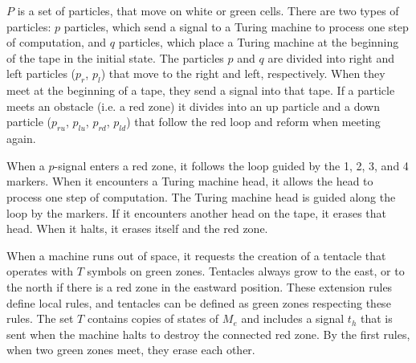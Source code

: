 \documentclass{llncs}
\begin{document}
    
 $P$ is a set of particles, that move on white or green cells. There are two types of particles: $p$ particles, which send a signal to a Turing machine to process one step of computation, and $q$ particles, which place a Turing machine at the beginning of the tape in the initial state. The particles $p$ and $q$ are divided into right and left particles ($p_r$, $p_l$) that move to the right and left, respectively. When they meet at the beginning of a tape, they send a signal into that tape. If a particle meets an obstacle (i.e. a red zone) it divides into an up particle and a down particle ($p_{ru}$, $p_{lu}$, $p_{rd}$, $p_{ld}$) that follow the red loop and reform when meeting again. 
 
When a $p$-signal enters a red zone, it follows the loop guided by the 1, 2, 3, and 4 markers. When it encounters a Turing machine head, it allows the head to process one step of computation. The Turing machine head is guided along the loop by the markers. If it encounters another head on the tape, it erases that head. When it halts, it erases itself and the red zone.
 
When a machine runs out of space, it requests the creation of a tentacle that operates with $T$ symbols on green zones. Tentacles always grow to the east, or to the north if there is a red zone in the eastward position. These extension rules define local rules, and tentacles can be defined as green zones respecting these rules. The set $T$ contains copies of states of $M_e$ and includes a signal $t_h$ that is sent when the machine halts to destroy the connected red zone.  By the first rules, when two green zones meet, they erase each other.

\end{document}

